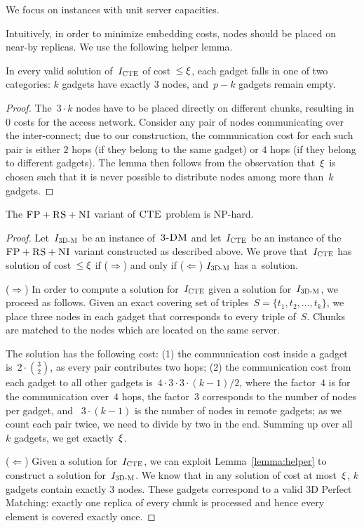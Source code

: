 We focus on instances with unit server capacities.

Intuitively, in order to minimize embedding costs,
nodes should be placed on near-by replicas. We use the following
helper lemma.
\begin{lemma}\label{lemma:helper}
In every valid solution of~$I_{\mathrm{\textsc{CTE}}}$ of cost~$\leq \xi$, each gadget
falls in one of two categories:
$k$ gadgets have exactly
$3$ nodes, and~$p-k$ gadgets remain empty.
\end{lemma}
\begin{proof}
The~$3\cdot k$ nodes have to be placed
directly on different chunks, resulting in 0 costs for the access network.
Consider any pair of nodes
communicating over the
inter-connect; due to our construction, the communication cost
for each such pair is either
$2$ hops (if they belong to the same gadget) or $4$ hops (if they belong
to different gadgets).
The lemma then follows from the observation that~$\xi$
is chosen such that it is never possible to distribute nodes
among more than~$k$ gadgets.
\end{proof}

\begin{theorem}
\label{theorem:fp_rs_cc}
The $\textsc{FP}+\textsc{RS}+\textsc{NI}$ variant of $\textsc{CTE}$ problem is NP-hard.
\end{theorem}
\begin{proof}
Let~$I_{\mathrm{\textsc{3D-M}}}$ be an instance of~$\textsc{3-DM}$ and let~$I_{\mathrm{\textsc{CTE}}}$ be an instance of
the~$\textsc{FP}+\textsc{RS}+\textsc{NI}$ variant constructed as described above.
We prove that~$I_{\mathrm{\textsc{CTE}}}$ has solution of cost~$\leq \xi$ if ($\Rightarrow$) and only if
($\Leftarrow$)
$I_{\mathrm{\textsc{3D-M}}}$ has a~solution.

($\Rightarrow$) In order to compute a solution
for~$I_{\mathrm{\textsc{CTE}}}$ given a solution for~$I_{\mathrm{\textsc{3D-M}}}$, we proceed as follows.
Given an exact covering set of triples~$S = \{t_1, t_2,
\ldots, t_k\}$, we place three nodes in each gadget that
corresponds to every triple of~$S$. Chunks are matched to the nodes which are located
on the same server.

The solution has the following cost:
(1) the communication cost inside a gadget is~$2 \cdot {3 \choose 2}$,
  as every pair contributes two hops;
  (2) the communication cost from each gadget to all other gadgets is~$4
  \cdot 3 \cdot 3 \cdot (k - 1) / 2$, where the factor~$4$ is
  for the
  communication over~$4$ hops, the factor~$3$
  corresponds to the number of nodes per gadget, and
 ~$3 \cdot (k-1)$ is the number of nodes in remote gadgets;
  as we count each pair twice, we need to divide by two in the end.
Summing up over all~$k$ gadgets, we get exactly~$\xi$.

($\Leftarrow$) Given a solution for~$I_{\mathrm{\textsc{CTE}}}$,
we can exploit Lemma~\ref{lemma:helper} to construct a solution for~$I_{\mathrm{\textsc{3D-M}}}$.
We know that in any solution of cost at most~$\xi$,
$k$ gadgets contain exactly 3 nodes. These gadgets correspond to a valid
3D Perfect Matching: exactly one replica of every chunk is processed and
hence every element is covered exactly once.
\end{proof}


